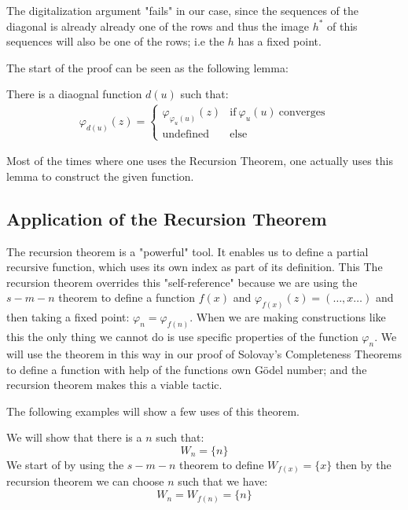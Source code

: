 \documentclass[../main.tex]{subfiles}
\begin{document}
The digitalization argument "fails" in our case, since the sequences of the
diagonal is already already one of the rows and thus the image $h^*$ of this
sequences will also be one of the rows; i.e the $h$ has a fixed point.

The start of the proof can be seen as the following lemma:
\begin{lem}
	There is a diaognal function $d(u)$ such that:
	\begin{align}\varphi_{d(u)}(z)=\begin{cases}
		\varphi_{\varphi_u(u)}(z)& \text{if}\ \varphi_u(u)\
		\text{converges}\\
		\text{undefined} & \text{else}
	\end{cases}
	\end{align}
\end{lem}

Most of the times where one uses the Recursion Theorem, one actually uses this
lemma to construct the given function.

\subsection{Application of the Recursion Theorem}
The recursion theorem is a "powerful" tool. It enables us to define a partial
recursive function, which uses its own index as part of its definition. This
The recursion theorem overrides this "self-reference" because we are using the
$s-m-n$ theorem to define a function $f(x)$ and
$\varphi_{f(x)}(z)=(\ldots,x\ldots)$ and then taking a fixed point:
$\varphi_n=\varphi_{f(n)}$.  When we are making constructions like this the
only thing we cannot do is use specific properties of the function $\varphi_n$.
We will use the theorem in this way in our proof of Solovay's Completeness
Theorems to define a function with help of the functions own Gödel number; and
the recursion theorem makes this a viable tactic.

The
following examples will show a few uses of this theorem.
\begin{exmp}
	We will show that there is a $n$ such that:
	$$W_n=\{n\}$$
	We start of by using the $s-m-n$ theorem to define $W_{f(x)}=\{x\}$
	then by the recursion theorem we can choose $n$ such that we have:
	$$W_n=W_{f(n)}=\{n\}$$
\end{exmp}
\end{document}
